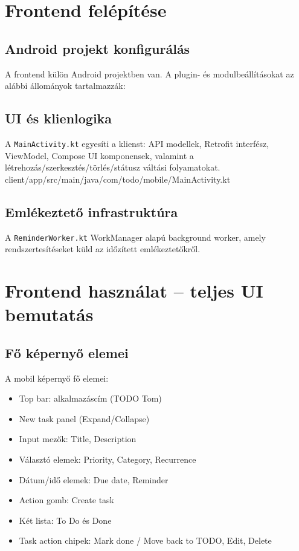 \documentclass[12pt,a4paper]{article}
\begin{document}
\section{Frontend felépítése}
\subsection{Android projekt konfigurálás}
A frontend külön Android projektben van. A plugin- és modulbeállításokat az alábbi állományok tartalmazzák:

\subsection{UI és klienlogika}
A \texttt{MainActivity.kt} egyesíti a klienst: API modellek, Retrofit interfész, ViewModel, Compose UI komponensek, valamint a létrehozás/szerkesztés/törlés/státusz váltási folyamatokat.
client/app/src/main/java/com/todo/mobile/MainActivity.kt

\subsection{Emlékeztető infrastruktúra}
A \texttt{ReminderWorker.kt} WorkManager alapú background worker, amely rendszertesítéseket küld az időzített emlékeztetőkről.

\section{Frontend használat -- teljes UI bemutatás}
\subsection{Fő képernyő elemei}
A mobil képernyő fő elemei:
\begin{itemize}
  \item Top bar: alkalmazáscím (TODO Tom)
  \item New task panel (Expand/Collapse)
  \item Input mezők: Title, Description
  \item Választó elemek: Priority, Category, Recurrence
  \item Dátum/idő elemek: Due date, Reminder
  \item Action gomb: Create task
  \item Két lista: To Do és Done
  \item Task action chipek: Mark done / Move back to TODO, Edit, Delete
\end{itemize}
\end{document}
